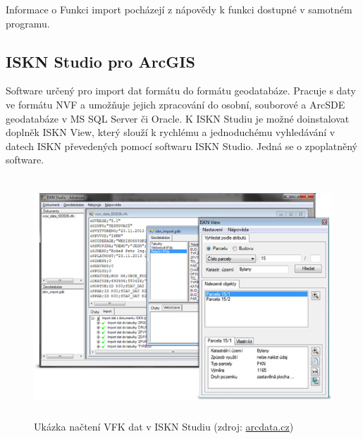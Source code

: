 Informace o Funkci import  pocházejí z nápovědy k funkci dostupné v samotném programu.
\subsection{ISKN Studio pro ArcGIS}
Software určený pro import dat formátu  do formátu
geodatabáze. Pracuje s daty ve formátu NVF a umožňuje jejich
zpracování do osobní, souborové a ArcSDE geodatabáze v MS SQL Server
či Oracle. K ISKN Studiu je možné doinstalovat doplněk ISKN View,
který slouží k rychlému a jednoduchému vyhledávání v datech ISKN
převedených pomocí softwaru ISKN Studio. Jedná se o zpoplatněný
software. \cite{arcgis}

\begin{figure}[H]
	 \centering
      \includegraphics[height=9cm]{./pictures/iskn_studio.jpeg}
      \caption{Ukázka načtení VFK dat v ISKN Studiu (zdroj:
\href{https://www.arcdata.cz/uploads/media/general/0001/01/68f0bfd90cf19d903a57fc8457e1f228a7dd47f4.jpeg}{arcdata.cz})}
      \label{fig:ISKNStudio}
  \end{figure}
